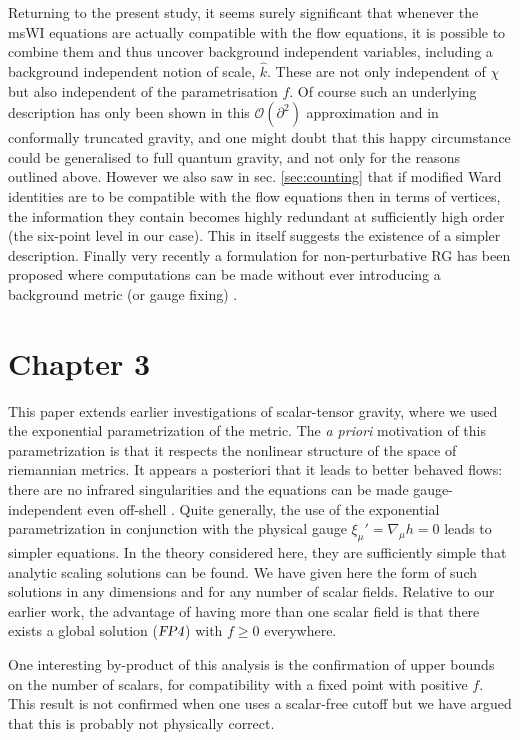 \documentclass[11pt]{book} %
\newcommand{\FPfour} {\textsl{FP4}}
\newcommand{\hk}{\hat k}
\numberwithin{equation}{chapter}
\begin{document}
Returning to the present study, it seems surely significant that
whenever the msWI equations  are actually compatible with the flow equations,
it is possible to combine them and thus uncover background independent variables,
including a background independent notion of scale, $\hk$.
These are not only independent of $\chi$ but also independent of the parametrisation $f$.
Of course such an underlying description has only been shown in this $\mathcal{O}(\partial^2)$ approximation and
in conformally truncated gravity, and one might doubt that this happy circumstance could be generalised to
full quantum gravity, and not only for the reasons outlined above.
However we also saw in sec. \ref{sec:counting} that if modified Ward identities are to be compatible with
the flow equations then in terms of vertices, the information they contain becomes highly redundant
at sufficiently high order (the six-point level in our case).
This in itself suggests the existence of a simpler description.
Finally very recently a formulation for non-perturbative RG has been proposed where computations can be
made without ever introducing a background metric (or gauge fixing) \cite{Morris:2016nda}.


\section*{Chapter 3}

This paper extends earlier investigations of scalar-tensor
gravity, where we used the exponential parametrization of the metric.
The {\it a priori} motivation of this parametrization is that
it respects the nonlinear structure of the space of riemannian metrics.
It appears a posteriori that it leads to better behaved flows:
there are no infrared singularities \cite{Percacci:2015wwa,Falls:2015qga}
and the equations can be made gauge-independent even off-shell
\cite{Falls:2015qga}.
Quite generally, the use of the exponential parametrization
in conjunction with the physical gauge $\xi_\mu'=\nabla_\mu h=0$
leads to simpler equations.
In the theory considered here, they are sufficiently simple
that analytic scaling solutions can be found.
We have given here the form of such solutions in any dimensions
and for any number of scalar fields.
Relative to our earlier work, the advantage of having more than
one scalar field is that there exists a global solution ($\FPfour$)
with $f\geq 0$ everywhere.

One interesting by-product of this analysis is the confirmation
of upper bounds on the number of scalars, for compatibility with
a fixed point with positive $f$.
This result is not confirmed when one uses a scalar-free cutoff
but we have argued that this is probably not physically correct.
\end{document}
